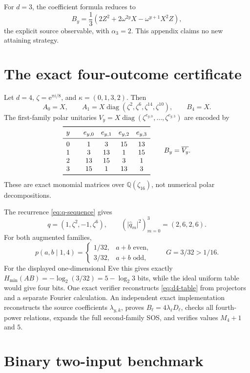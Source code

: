 \documentclass[11pt]{article}
\theoremstyle{definition}
\theoremstyle{remark}
\newcommand{\e}{\mathrm e}
\newcommand{\absop}[1]{\lvert #1\rvert}
\begin{document}
For \(d=3\), the coefficient formula reduces to
\[
 B_y=\frac13\left(2Z^2+2\omega^{2y}X
 -\omega^{y+1}X^2Z\right),
\]
the explicit source observable, with \(\alpha_3=2\).  This appendix claims
no new attaining strategy.

\section{The exact four-outcome certificate}
\label{app:d4}

Let \(d=4\), \(\zeta=\e^{\pi i/8}\), and
\(\kappa=(0,1,3,2)\).  Then
\[
 A_0=X,
 \qquad
 A_1=X\operatorname{diag}(\zeta^2,\zeta^6,\zeta^{14},\zeta^{10}),
 \qquad B_4=X.
\]
The first-family polar unitaries
\(V_y=X\operatorname{diag}(\zeta^{e_{y,0}},\ldots,\zeta^{e_{y,3}})\)
are encoded by
\[
\begin{array}{c@{\qquad}cccc}
\toprule
y&e_{y,0}&e_{y,1}&e_{y,2}&e_{y,3}\\
\midrule
0&1&3&15&13\\
1&3&13&1&15\\
2&13&15&3&1\\
3&15&1&13&3\\
\bottomrule
\end{array}
\qquad B_y=\overline{V_y}.
\]
These are exact monomial matrices over
\(\mathbb Q(\zeta_{16})\), not numerical polar decompositions.

The recurrence \eqref{eq:q-sequence} gives
\[
 q=(1,\zeta^2,-1,\zeta^6),
 \qquad
 (\absop{\widehat q_m}^2)_{m=0}^3=(2,6,2,6).
\]
For both augmented families,
\begin{equation}
 p(a,b\mid1,4)=
 \begin{cases}
 1/32,&a+b\text{ even},\\
 3/32,&a+b\text{ odd},
 \end{cases}
 \qquad G=3/32>1/16.
 \label{eq:d4-table}
\end{equation}
For the displayed one-dimensional Eve this gives exactly
\(H_{\min}(AB)=-\log_2(3/32)=5-\log_2 3\) bits, while the ideal uniform
table would give four bits.
One exact verifier reconstructs \eqref{eq:d4-table} from projectors and a
separate Fourier calculation.  An independent exact implementation
reconstructs the source coefficients \(\lambda_{y,k}\), proves
\(\widehat B_\ell=4\lambda_\ell D_\ell\), checks all fourth-power relations,
expands
the full second-family SOS, and verifies values \(M_4+1\) and \(5\).

\section{Binary two-input benchmark}
\label{app:binary}
\end{document}
